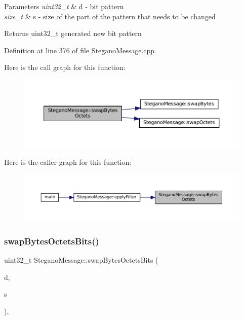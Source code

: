 \begin{DoxyParams}{Parameters}
{\em uint32\+\_\+t} & d -\/ bit pattern \\
\hline
{\em size\+\_\+t} & s -\/ size of the part of the pattern that needs to be changed \\
\hline
\end{DoxyParams}
\begin{DoxyReturn}{Returns}
uint32\+\_\+t generated new bit pattern 
\end{DoxyReturn}


Definition at line 376 of file Stegano\+Message.\+cpp.

Here is the call graph for this function\+:\nopagebreak
\begin{figure}[H]
\begin{center}
\leavevmode
\includegraphics[width=350pt]{classSteganoMessage_ad21d0b7dd149e81d9a199fb26a799da4_cgraph}
\end{center}
\end{figure}
Here is the caller graph for this function\+:\nopagebreak
\begin{figure}[H]
\begin{center}
\leavevmode
\includegraphics[width=350pt]{classSteganoMessage_ad21d0b7dd149e81d9a199fb26a799da4_icgraph}
\end{center}
\end{figure}
\mbox{\label{classSteganoMessage_ab17fa1a4dc587ae268e400913cc5f0c8}} 
\subsubsection{\texorpdfstring{swapBytesOctetsBits()}{swapBytesOctetsBits()}}
{\footnotesize\ttfamily uint32\+\_\+t Stegano\+Message\+::swap\+Bytes\+Octets\+Bits (\begin{DoxyParamCaption}\item[{uint32\+\_\+t}]{d,  }\item[{size\+\_\+t}]{s }\end{DoxyParamCaption})\hspace{0.3cm}{\ttfamily [static]}, {\ttfamily [private]}}



